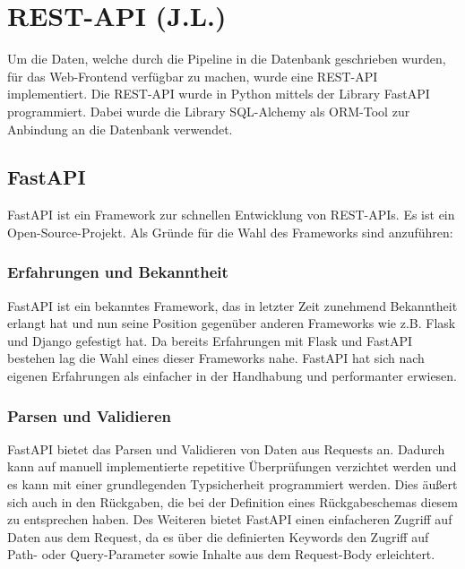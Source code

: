 \section{REST-API (J.L.)}
\label{sec-restapi}

Um die Daten, welche durch die Pipeline in die Datenbank geschrieben wurden, 
für das Web-Frontend verfügbar zu machen, wurde eine REST-API implementiert. 
Die REST-API wurde in Python \cite{python} mittels der Library FastAPI \cite{fastapi} 
programmiert. Dabei wurde die Library SQL-Alchemy \cite{sqlalchemy} als ORM-Tool 
zur Anbindung an die Datenbank verwendet.

\subsection{FastAPI}

FastAPI ist ein Framework zur schnellen Entwicklung von REST-APIs. 
Es ist ein Open-Source-Projekt. Als Gründe für die Wahl des Frameworks sind anzuführen: 

\subsubsection{Erfahrungen und Bekanntheit}
FastAPI ist ein bekanntes Framework, das in letzter Zeit zunehmend Bekanntheit erlangt 
hat und nun seine Position gegenüber anderen Frameworks wie z.B. Flask \cite{flask} und 
Django \cite{django} gefestigt hat. Da bereits Erfahrungen mit Flask und FastAPI bestehen 
lag die Wahl eines dieser Frameworks nahe. FastAPI hat sich nach eigenen Erfahrungen als 
einfacher in der Handhabung und performanter erwiesen.

\subsubsection{Parsen und Validieren}
FastAPI bietet das Parsen und Validieren von Daten aus Requests an. Dadurch kann 
auf manuell implementierte repetitive Überprüfungen verzichtet werden und es kann mit
einer grundlegenden Typsicherheit programmiert werden. Dies äußert sich auch in den Rückgaben,
die bei der Definition eines Rückgabeschemas diesem zu entsprechen haben. Des Weiteren bietet 
FastAPI einen einfacheren Zugriff auf Daten aus dem Request, da es über die definierten Keywords
den Zugriff auf Path- oder Query-Parameter sowie Inhalte aus dem Request-Body erleichtert.

